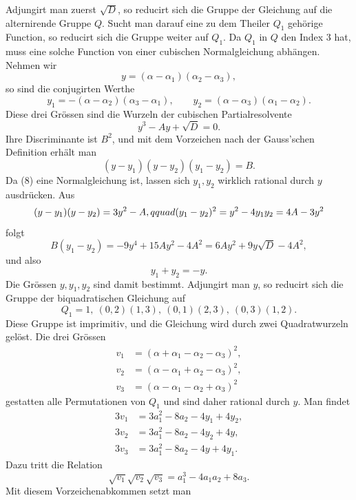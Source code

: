\documentclass[11pt]{article}
\begin{document}
Adjungirt man zuerst $\sqrt D$, so reducirt sich die Gruppe der Gleichung auf die alternirende Gruppe $Q$. Sucht man darauf eine zu dem Theiler $Q_1$ gehörige Function, so reducirt sich die Gruppe weiter auf $Q_1$. Da $Q_1$ in $Q$ den Index $3$ hat, muss eine solche Function von einer cubischen Normalgleichung abhängen. Nehmen wir
\[
        y=(\alpha-\alpha_1)(\alpha_2-\alpha_3),                       \tag{6}
\]
so sind die conjugirten Werthe
\[
        y_1=-(\alpha-\alpha_2)(\alpha_3-\alpha_1),\qquad
        y_2=(\alpha-\alpha_3)(\alpha_1-\alpha_2).                     \tag{7}
\]
Diese drei Grössen sind die Wurzeln der cubischen Partialresolvente
\[
        y^3-Ay+\sqrt D=0.                                              \tag{8}
\]
Ihre Discriminante ist $B^2$, und mit dem Vorzeichen nach der Gauss'schen Definition erhält man
\[
        (y-y_1)(y-y_2)(y_1-y_2)=B.                                     \tag{9}
\]
Da (8) eine Normalgleichung ist, lassen sich $y_1,y_2$ wirklich rational durch $y$ ausdrücken. Aus
\[
 (y-y_1)(y-y_2)=3y^2-A,\\qquad
 (y_1-y_2)^2=y^2-4y_1y_2=4A-3y^2
\]
folgt
\[
        B(y_1-y_2)=-9y^4+15Ay^2-4A^2=6Ay^2+9y\sqrt D-4A^2,
\]
und also
\[
        y_1+y_2=-y.                                                    \tag{10}
\]
Die Grössen $y,y_1,y_2$ sind damit bestimmt. Adjungirt man $y$, so reducirt sich die Gruppe der biquadratischen Gleichung auf
\[
        Q_1=1,\ (0,2)(1,3),\ (0,1)(2,3),\ (0,3)(1,2).
\]
Diese Gruppe ist imprimitiv, und die Gleichung wird durch zwei Quadratwurzeln gelöst. Die drei Grössen
\[
\begin{aligned}
        v_1&=(\alpha+\alpha_1-\alpha_2-\alpha_3)^2,\\
        v_2&=(\alpha-\alpha_1+\alpha_2-\alpha_3)^2,\\
        v_3&=(\alpha-\alpha_1-\alpha_2+\alpha_3)^2
\end{aligned}                                                          \tag{11}
\]
gestatten alle Permutationen von $Q_1$ und sind daher rational durch $y$. Man findet
\[
\begin{aligned}
        3v_1&=3a_1^2-8a_2-4y_1+4y_2,\\
        3v_2&=3a_1^2-8a_2-4y_2+4y,\\
        3v_3&=3a_1^2-8a_2-4y+4y_1.
\end{aligned}                                                          \tag{12}
\]
Dazu tritt die Relation
\[
        \sqrt{v_1}\sqrt{v_2}\sqrt{v_3}=a_1^3-4a_1a_2+8a_3.             \tag{13}
\]
Mit diesem Vorzeichenabkommen setzt man
\end{document}
